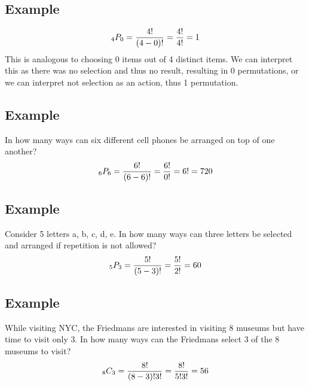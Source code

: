\documentclass[letterpaper, 12pt]{math}
\begin{document}
\subsection*{Example}
\[ _{4}P_{0} = \frac{4!}{(4-0)!} = \frac{4!}{4!} = 1\]
This is analogous to choosing 0 items out of 4 distinct items. We can
interpret this as there was no selection and thus no result, resulting in 0
permutations, or we can interpret not selection as an action, thus 1
permutation.

\subsection*{Example}
In how many ways can six different cell phones be arranged on top of one
another?
\[ _{6}P_{6} = \frac{6!}{(6-6)!} = \frac{6!}{0!} = 6! = 720 \]

\subsection*{Example}
Consider 5 letters a, b, c, d, e. In how many ways can three letters be
selected and arranged if repetition is not allowed?
\[ _{5}P_{3} = \frac{5!}{(5-3)!} = \frac{5!}{2!} = 60 \]

\subsection*{Example}
While visiting NYC, the Friedmans are interested in visiting 8 museums but have
time to visit only 3. In how many ways can the Friedmans select 3 of the 8
museums to visit?
\[ _{8}C_{3} = \frac{8!}{(8-3)!3!} = \frac{8!}{5!3!} = 56 \]
\end{document}
